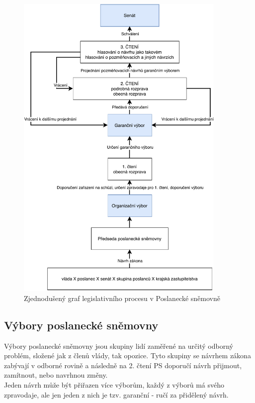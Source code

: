 \begin{figure}
    \centering
    \includegraphics[width=0.9\textwidth]{obrazky-figures/legislativni_proces_my.pdf}
    \caption{Zjednodušený graf legislativního procesu v Poslanecké sněmovně}
    \label{fig:legislativni_proces}
\end{figure}
 
\subsection{Výbory poslanecké sněmovny}
\label{vybory}
\par Výbory poslanecké sněmovny jsou skupiny lidí zaměřené na určitý odborný problém, složené jak z členů vlády, tak opozice. Tyto skupiny se návrhem zákona zabývají v odborné rovině a následně na 2. čtení PS doporučí návrh přijmout, zamítnout, nebo navrhnou změny.\\
Jeden návrh může být přiřazen více výborům, každý z výborů má svého zpravodaje, ale jen jeden z nich je tzv. garanční - ručí za přidělený návrh. \\

